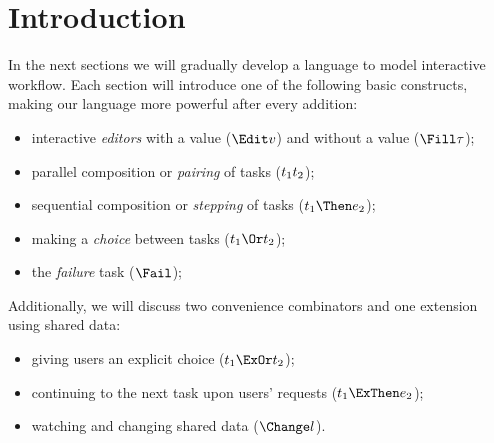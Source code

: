 
\section{Introduction}

In the next sections we will gradually develop a language to model interactive workflow.
Each section will introduce one of the following basic constructs,
making our language more powerful after every addition:
\begin{itemize}
  \item interactive \emph{editors} with a value ($\Edit v$) and without a value ($\Fill \tau$);
  \item parallel composition or \emph{pairing} of tasks ($t_1 \relax t_2$);
  \item sequential composition or \emph{stepping} of tasks ($t_1 \Then e_2$);
  \item making a \emph{choice} between tasks ($t_1 \Or t_2$);
  \item the \emph{failure} task ($\Fail$);
\end{itemize}
Additionally, we will discuss two convenience combinators and one extension using shared data:
\begin{itemize}
  \item giving users an explicit choice ($t_1 \ExOr t_2$);
  \item continuing to the next task upon users' requests ($t_1 \ExThen e_2$);
  \item watching and changing shared data ($\Change l$).
\end{itemize}


